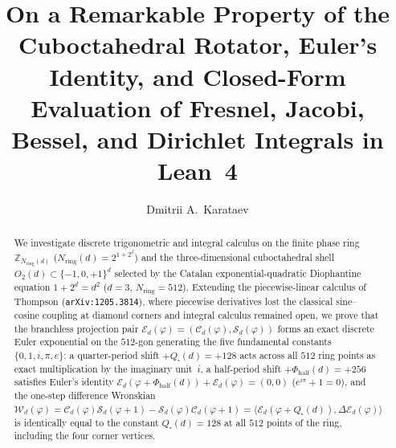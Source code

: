 \documentclass[11pt,a4paper]{article}
\title{\textbf{On a Remarkable Property of the Cuboctahedral Rotator, Euler's Identity, and Closed-Form Evaluation of Fresnel, Jacobi, Bessel, and Dirichlet Integrals in Lean~4}}
\author{Dmitrii A.~Karataev}
\date{}
\theoremstyle{plain}
\theoremstyle{definition}
\begin{document}
\maketitle

\begin{abstract}
We investigate discrete trigonometric and integral calculus on the finite phase ring $\mathbb{Z}_{N_{\mathrm{ring}}(d)}$ ($N_{\mathrm{ring}}(d) = 2^{1+2^d}$) and the three-dimensional cuboctahedral shell $O_2(d)\subset\{-1,0,+1\}^d$ selected by the Catalan exponential-quadratic Diophantine equation $1+2^d=d^2$ ($d=3$, $N_{\mathrm{ring}}=512$). Extending the piecewise-linear calculus of Thompson (\texttt{arXiv:1205.3814}), where piecewise derivatives lost the classical sine--cosine coupling at diamond corners and integral calculus remained open, we prove that the branchless projection pair $\mathcal{E}_d(\varphi) = (\mathcal{C}_d(\varphi),\mathcal{S}_d(\varphi))$ forms an exact discrete Euler exponential on the $512$-gon generating the five fundamental constants $\{0,1,i,\pi,e\}$: a quarter-period shift $+Q_\square(d)=+128$ acts across all $512$ ring points as exact multiplication by the imaginary unit~$i$, a half-period shift $+\Phi_{\mathrm{half}}(d)=+256$ satisfies Euler's identity $\mathcal{E}_d(\varphi+\Phi_{\mathrm{half}}(d))+\mathcal{E}_d(\varphi)=(0,0)$ ($e^{i\pi}+1=0$), and the one-step difference Wronskian $\mathcal{W}_d(\varphi)=\mathcal{C}_d(\varphi)\mathcal{S}_d(\varphi+1)-\mathcal{S}_d(\varphi)\mathcal{C}_d(\varphi+1)=\langle \mathcal{E}_d(\varphi+Q_\square(d)),\Delta\mathcal{E}_d(\varphi)\rangle$ is identically equal to the constant $Q_\square(d)=128$ at all $512$ points of the ring, including the four corner vertices.


\end{abstract}
\end{document}
